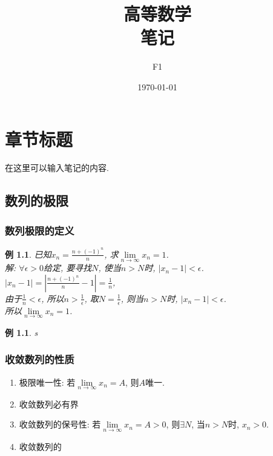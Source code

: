 \documentclass[12pt, a4paper, oneside]{ctexbook}
\title{{\Huge{\textbf{高等数学}}}\\笔记}
\author{F1}
\date{\today}
\newtheorem{example}[theorem]{例}
\begin{document}
\maketitle

\setcounter{page}{1}



{}
\setcounter{page}{1}
\tableofcontents
\newpage
\setcounter{page}{1}

\chapter{章节标题}

在这里可以输入笔记的内容. 

\section{数列的极限}

\subsection{数列极限的定义}
\begin{example}
    已知$x_n = \frac{n + (-1)^n}{n}$, 求$\lim\limits_{n \to \infty}x_n = 1$.\\
    解: $\forall \epsilon > 0$给定, 要寻找$N$, 使当$n > N$时, $|x_n - 1| < \epsilon$.\\
    $|x_n - 1| = |\frac{n + (-1)^n}{n} - 1| = \frac{1}{n}$,\\
    由于$\frac{1}{n} < \epsilon$, 所以$n > \frac{1}{\epsilon}$, 取$N = \frac{1}{\epsilon}$, 则当$n > N$时, $|x_n - 1| < \epsilon$.\\
    所以$\lim\limits_{n \to \infty}x_n = 1$.
\end{example}

\begin{example}
    s
\end{example}

\subsection{收敛数列的性质}
\begin{enumerate}
    \item 极限唯一性: 若$\lim\limits_{n \to \infty}x_n = A$, 则$A$唯一.
    \item 收敛数列必有界
    \item 收敛数列的保号性: 若$\lim\limits_{n \to \infty}x_n = A > 0$, 则$\exists N$, 当$n > N$时, $x_n > 0$.
    \item 收敛数列的
\end{enumerate}
\end{document}
